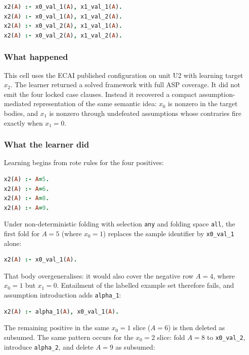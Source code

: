 \documentclass[11pt]{article}
\begin{document}
\begin{lstlisting}[style=logic,language=Prolog]
x2(A) :- x0_val_1(A), x1_val_1(A).
x2(A) :- x0_val_1(A), x1_val_2(A).
x2(A) :- x0_val_2(A), x1_val_1(A).
x2(A) :- x0_val_2(A), x1_val_2(A).
\end{lstlisting}

\subsubsection{What happened}

This cell uses the ECAI published configuration on unit U2 with learning target \(x_2\). The learner returned a solved framework with full ASP coverage. It did not emit the four locked case clauses. Instead it recovered a compact assumption-mediated representation of the same semantic idea: \(x_0\) is nonzero in the target bodies, and \(x_1\) is nonzero through undefeated assumptions whose contraries fire exactly when \(x_1=0\).

\subsubsection{What the learner did}

Learning begins from rote rules for the four positives:

\begin{lstlisting}[style=logic,language=Prolog]
x2(A) :- A=5.
x2(A) :- A=6.
x2(A) :- A=8.
x2(A) :- A=9.
\end{lstlisting}

Under non-deterministic folding with selection \texttt{any} and folding space \texttt{all}, the first fold for \(A=5\) (where \(x_0=1\)) replaces the sample identifier by \texttt{x0\_val\_1} alone:

\begin{lstlisting}[style=logic,language=Prolog]
x2(A) :- x0_val_1(A).
\end{lstlisting}

That body overgeneralises: it would also cover the negative row \(A=4\), where \(x_0=1\) but \(x_1=0\). Entailment of the labelled example set therefore fails, and assumption introduction adds \texttt{alpha\_1}:

\begin{lstlisting}[style=logic,language=Prolog]
x2(A) :- alpha_1(A), x0_val_1(A).
\end{lstlisting}

The remaining positive in the same \(x_0=1\) slice (\(A=6\)) is then deleted as subsumed. The same pattern occurs for the \(x_0=2\) slice: fold \(A=8\) to \texttt{x0\_val\_2}, introduce \texttt{alpha\_2}, and delete \(A=9\) as subsumed:
\end{document}
